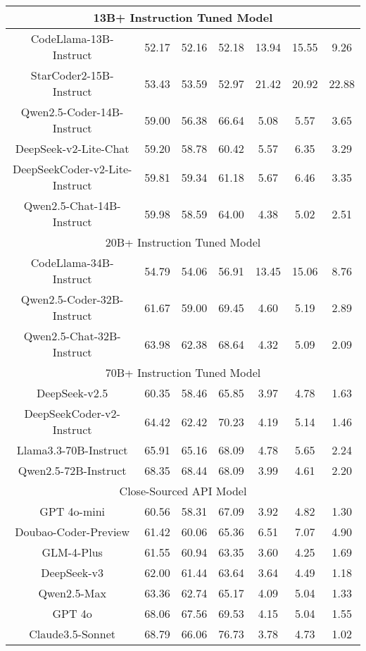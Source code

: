 \documentclass[11pt, a4paper, logo, copyright, nonumbering, amsart]{map}
\begin{document}
\begin{CJK*}{UTF8}{gbsn}
\begin{table}[!t]
\begin{adjustbox}{width=0.8\textwidth}
\begin{tabular}{c|cccccc}
    \midrule
    \multicolumn{7}{c}{13B+ Instruction Tuned Model} \\
    \midrule
    CodeLlama-13B-Instruct & 52.17 & 52.16 & 52.18 & 13.94 & 15.55 & 9.26 \\
    StarCoder2-15B-Instruct & 53.43 & 53.59 & 52.97 & 21.42 & 20.92 & 22.88 \\
    Qwen2.5-Coder-14B-Instruct & 59.00 & 56.38 & 66.64 & 5.08 & 5.57 & 3.65 \\
    DeepSeek-v2-Lite-Chat & 59.20 & 58.78 & 60.42 & 5.57 & 6.35 & 3.29 \\
    DeepSeekCoder-v2-Lite-Instruct & 59.81 & 59.34 & 61.18 & 5.67 & 6.46 & 3.35 \\
    Qwen2.5-Chat-14B-Instruct & 59.98 & 58.59 & 64.00 & 4.38 & 5.02 & 2.51 \\

    \midrule
    \multicolumn{7}{c}{20B+ Instruction Tuned Model} \\
    \midrule
    CodeLlama-34B-Instruct & 54.79 & 54.06 & 56.91 & 13.45 & 15.06 & 8.76 \\
    Qwen2.5-Coder-32B-Instruct & 61.67 & 59.00 & 69.45 & 4.60 & 5.19 & 2.89 \\
    Qwen2.5-Chat-32B-Instruct & 63.98 & 62.38 & 68.64 & 4.32 & 5.09 & 2.09 \\

    \midrule
    \multicolumn{7}{c}{70B+ Instruction Tuned Model} \\
    \midrule
    DeepSeek-v2.5 & 60.35 & 58.46 & 65.85 & 3.97 & 4.78 & 1.63 \\
    DeepSeekCoder-v2-Instruct & 64.42 & 62.42 & 70.23 & 4.19 & 5.14 & 1.46 \\
    Llama3.3-70B-Instruct & 65.91 & 65.16 & 68.09 & 4.78 & 5.65 & 2.24 \\
    Qwen2.5-72B-Instruct & 68.35 & 68.44 & 68.09 & 3.99 & 4.61 & 2.20 \\

    \midrule
    \multicolumn{7}{c}{Close-Sourced API Model} \\
    \midrule
    GPT 4o-mini & 60.56 & 58.31 & 67.09 & 3.92 & 4.82 & 1.30 \\
    Doubao-Coder-Preview & 61.42 & 60.06 & 65.36 & 6.51 & 7.07 & 4.90 \\
    GLM-4-Plus & 61.55 & 60.94 & 63.35 & 3.60 & 4.25 & 1.69 \\
    DeepSeek-v3 & 62.00 & 61.44 & 63.64 & 3.64 & 4.49 & 1.18 \\
    Qwen2.5-Max & 63.36 & 62.74 & 65.17 & 4.09 & 5.04 & 1.33 \\
    GPT 4o & 68.06 & 67.56 & 69.53 & 4.15 & 5.04 & 1.55 \\
    Claude3.5-Sonnet & 68.79 & 66.06 & 76.73 & 3.78 & 4.73 & 1.02 \\


\end{tabular}
\end{adjustbox}
\end{table}
\end{CJK*}
\end{document}
